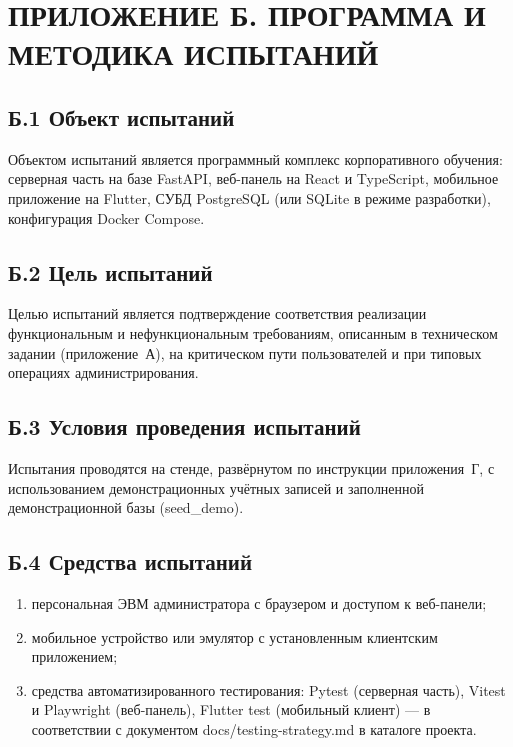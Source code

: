\chapter{{\fontsize{14pt}{21pt}\selectfont\MakeUppercase{Приложение Б. Программа и методика испытаний}}}
\label{app:pimi}

\section*{Б.1 Объект испытаний}

Объектом испытаний является программный комплекс корпоративного обучения: серверная часть на базе FastAPI, веб-панель на React и TypeScript, мобильное приложение на Flutter, СУБД PostgreSQL (или SQLite в режиме разработки), конфигурация Docker Compose.

\section*{Б.2 Цель испытаний}

Целью испытаний является подтверждение соответствия реализации функциональным и нефункциональным требованиям, описанным в техническом задании (приложение~А), на критическом пути пользователей и при типовых операциях администрирования.

\section*{Б.3 Условия проведения испытаний}

Испытания проводятся на стенде, развёрнутом по инструкции приложения~Г, с использованием демонстрационных учётных записей и заполненной демонстрационной базы (seed\_demo).

\section*{Б.4 Средства испытаний}

\begin{enumerate}
  \item персональная ЭВМ администратора с браузером и доступом к веб-панели;
  \item мобильное устройство или эмулятор с установленным клиентским приложением;
  \item средства автоматизированного тестирования: Pytest (серверная часть), Vitest и Playwright (веб-панель), Flutter test (мобильный клиент) --- в соответствии с документом docs/testing-strategy.md в каталоге проекта.
\end{enumerate}

